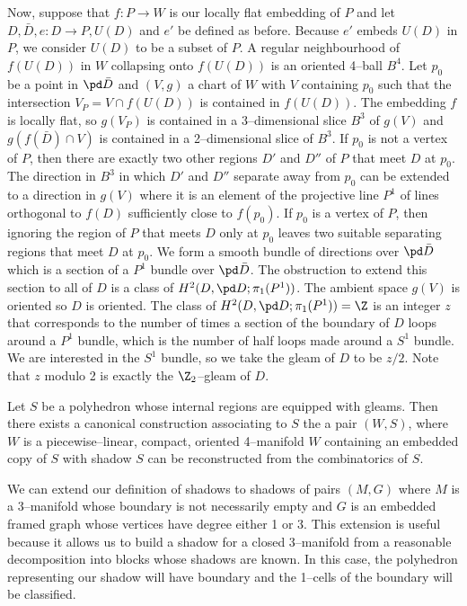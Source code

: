 \begin{defn}
  Now, suppose that $f:P\to W$ is our locally flat embedding of $P$ and let $D, \bar{D}, e: D \to P, U(D)$ and $e'$ be defined as before.
  Because $e'$ embeds $U(D)$ in $P$, we consider $U(D)$ to be a subset of $P$.
  A regular neighbourhood of $f(U(D))$ in $W$ collapsing onto $f(U(D))$ is an oriented 4--ball $B^4$.
  Let $p_0$ be a point in $\pd\bar{D}$ and $(V,g)$ a chart of $W$ with $V$ containing $p_0$ such that the intersection $V_P = V\cap f(U(D))$ is contained in $f(U(D))$.  
  The embedding $f$ is locally flat, so $g(V_P)$ is contained in a 3--dimensional slice $B^3$ of $g(V)$ and $g(f(\bar{D})\cap V)$ is contained in a 2--dimensional slice of $B^3$.
  If $p_0$ is not a vertex of $P$, then there are exactly two other regions $D'$ and $D''$ of $P$ that meet $D$ at $p_0$.
  The direction in $B^3$ in which $D'$ and $D''$ separate away from $p_0$ can be extended to a direction in $g(V)$ where it is an element of the projective line $P^1$ of lines orthogonal to $f(D)$ sufficiently close to $f(p_0)$.
  If $p_0$ is a vertex of $P$, then ignoring the region of $P$ that meets $D$ only at $p_0$ leaves two suitable separating regions that meet $D$ at $p_0$.
  We form a smooth bundle of directions over $\pd\bar{D}$ which is a section of a $P^1$ bundle over $\pd\bar{D}$.
  The obstruction to extend this section to all of $D$ is a class of $H^2 (D, \pd D; \pi_1 (P^1 ))$.
  The ambient space $g(V)$ is oriented so $D$ is oriented.
  The class of $H^2 (D, \pd D; \pi_1 (P^1 ))=\Z$ is an integer $z$ that corresponds to the number of times a section of the boundary of $D$ loops around a $P^1$ bundle, which is the number of half loops made around a $S^1$ bundle.
  We are interested in the $S^1$ bundle, so we take the gleam of $D$ to be $z/2$.
  Note that $z$ modulo 2 is exactly the $\Z_2$--gleam of $D$.
\end{defn}

\begin{theorem}\cite{Turaev91}
  \label{the:turaevreconstruction}
    Let $S$ be a polyhedron whose internal regions are equipped with gleams.
    Then there exists a canonical construction associating to $S$ the a pair $(W,S)$, where $W$ is a piecewise--linear, compact, oriented 4--manifold $W$ containing an embedded copy of $S$ with shadow $S$ can be reconstructed from the combinatorics of $S$.
\end{theorem}

We can extend our definition of shadows to shadows of pairs $(M,G)$ where $M$ is a 3--manifold whose boundary is not necessarily empty and $G$ is an embedded framed graph whose vertices have degree either 1 or 3.
This extension is useful because it allows us to build a shadow for a closed 3--manifold from a reasonable decomposition into blocks whose shadows are known.
In this case, the polyhedron representing our shadow will have boundary and the 1--cells of the boundary will be classified.

